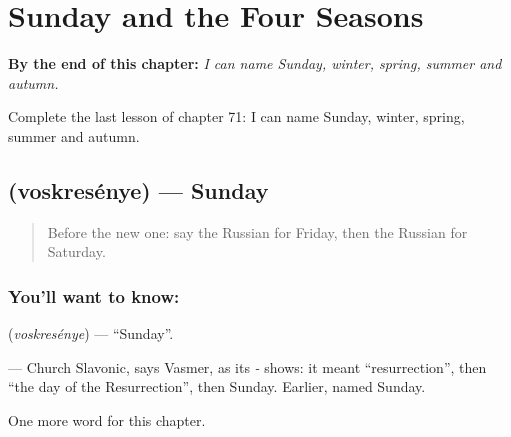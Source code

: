 
\chapter{Sunday and the Four Seasons}
\label{ch:ru-sunday-and-the-four-seasons}

\begin{chapteropening}
\textbf{By the end of this chapter:} \emph{I can name Sunday, winter, spring, summer and autumn.}

Complete the last lesson of chapter 71: I can name Sunday, winter, spring, summer and autumn.
\end{chapteropening}

\section[\texorpdfstring{\ru{воскресенье} (voskresénye)}{воскресенье (voskresénye)}]{ (voskresénye) — Sunday}

\label{lesson:RU-C71-sunday}



\begin{quote}
Before the new one: say the Russian for Friday, then the Russian for Saturday.
\end{quote}

\subsection*{You'll want to know: }
\textbf{} (\emph{voskresénye}) — \textquotedblleft{}Sunday\textquotedblright{}.

\begin{cousinweb}
\textbf{} — Church Slavonic, says Vasmer, as its \emph{-} shows: it meant \textquotedblleft{}resurrection\textquotedblright{}, then \textquotedblleft{}the day of the Resurrection\textquotedblright{}, then Sunday. Earlier, \emph{} named Sunday.
\end{cousinweb}

\begin{grammarlens}[title={What you've built}]
One more word for this chapter.
\end{grammarlens}

